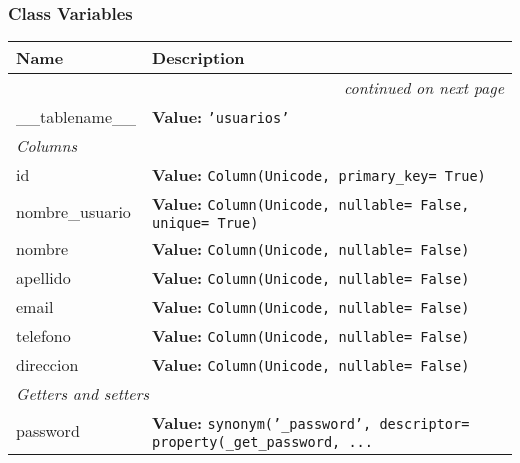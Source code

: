   \subsubsection{Class Variables}

    \vspace{-1cm}
\hspace{\varindent}\begin{longtable}{|p{\varnamewidth}|p{\vardescrwidth}|l}
\cline{1-2}
\cline{1-2} \centering \textbf{Name} & \centering \textbf{Description}& \\
\cline{1-2}
\endhead\cline{1-2}\multicolumn{3}{r}{\small\textit{continued on next page}}\\\endfoot\cline{1-2}
\endlastfoot\raggedright \_\-\_\-t\-a\-b\-l\-e\-n\-a\-m\-e\-\_\-\_\- & \raggedright \textbf{Value:} 
{\tt 'usuarios'}&\\
\cline{1-2}
\multicolumn{2}{|l|}{\textit{Columns}}\\
\cline{1-2}
\raggedright i\-d\- & \raggedright \textbf{Value:} 
{\tt Column(Unicode, primary\_key= True)}&\\
\cline{1-2}
\raggedright n\-o\-m\-b\-r\-e\-\_\-u\-s\-u\-a\-r\-i\-o\- & \raggedright \textbf{Value:} 
{\tt Column(Unicode, nullable= False, unique= True)}&\\
\cline{1-2}
\raggedright n\-o\-m\-b\-r\-e\- & \raggedright \textbf{Value:} 
{\tt Column(Unicode, nullable= False)}&\\
\cline{1-2}
\raggedright a\-p\-e\-l\-l\-i\-d\-o\- & \raggedright \textbf{Value:} 
{\tt Column(Unicode, nullable= False)}&\\
\cline{1-2}
\raggedright e\-m\-a\-i\-l\- & \raggedright \textbf{Value:} 
{\tt Column(Unicode, nullable= False)}&\\
\cline{1-2}
\raggedright t\-e\-l\-e\-f\-o\-n\-o\- & \raggedright \textbf{Value:} 
{\tt Column(Unicode, nullable= False)}&\\
\cline{1-2}
\raggedright d\-i\-r\-e\-c\-c\-i\-o\-n\- & \raggedright \textbf{Value:} 
{\tt Column(Unicode, nullable= False)}&\\
\cline{1-2}
\multicolumn{2}{|l|}{\textit{Getters and setters}}\\
\cline{1-2}
\raggedright p\-a\-s\-s\-w\-o\-r\-d\- & \raggedright \textbf{Value:} 
{\tt synonym('\_password', descriptor= property(\_get\_password, \texttt{...}}&\\
\cline{1-2}
\end{longtable}


